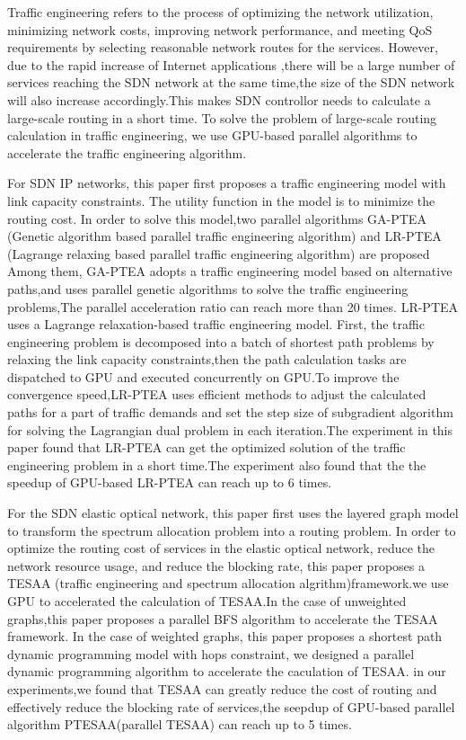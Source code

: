 \documentclass[master]{thesis-uestc}
\begin{document}
\begin{englishabstract}

Traffic engineering refers to the process of optimizing the network utilization, minimizing network costs, improving network performance, and meeting QoS requirements by selecting reasonable network routes for the services. However, due to the rapid increase of Internet applications ,there will be a large number of services reaching the SDN network at the same time,the size of the SDN network will also increase accordingly.This makes SDN controllor needs to calculate a large-scale routing in a short time. To solve the problem of large-scale routing calculation in traffic engineering, we use GPU-based parallel algorithms to accelerate the traffic engineering algorithm.

For SDN IP networks, this paper first proposes a traffic engineering model with link capacity constraints. The utility function in the model is to minimize the routing cost. In order to solve this model,two parallel algorithms GA-PTEA (Genetic algorithm based parallel traffic engineering algorithm) and LR-PTEA (Lagrange relaxing based parallel traffic engineering algorithm) are proposed
Among them, GA-PTEA adopts a traffic engineering model based on alternative paths,and uses parallel genetic algorithms to solve the traffic engineering problems,The parallel acceleration ratio can reach more than 20 times. LR-PTEA uses a Lagrange relaxation-based traffic engineering model. First, the traffic engineering problem is decomposed into a batch of shortest path problems by relaxing the link capacity constraints,then the path calculation tasks are dispatched to GPU and executed concurrently on GPU.To improve the convergence speed,LR-PTEA uses efficient methods to adjust the calculated paths for a part of traffic demands and set the step size of subgradient algorithm for solving the Lagrangian dual problem in each iteration.The experiment in this paper found that LR-PTEA can get the optimized solution of the traffic engineering problem in a short time.The experiment also found that the the speedup of GPU-based LR-PTEA can reach up to 6 times.

For the SDN elastic optical network, this paper first uses the layered graph model to transform the spectrum allocation problem into a routing problem. In order to optimize the routing cost of services in the elastic optical network, reduce the network resource usage, and reduce the blocking rate, this paper proposes a TESAA (traffic engineering and spectrum allocation algrithm)framework.we use GPU to accelerated the calculation of TESAA.In the case of unweighted graphs,this paper proposes a parallel BFS algorithm to accelerate the TESAA framework. In the case of weighted graphs, this paper proposes a shortest path dynamic programming model with hops constraint, we designed a parallel dynamic programming algorithm to accelerate the caculation of TESAA. in our experiments,we found that TESAA can greatly reduce the cost of routing and effectively reduce the blocking rate of services,the seepdup of GPU-based parallel algorithm PTESAA(parallel TESAA) can reach up to 5 times.





\end{englishabstract}
\end{document}
